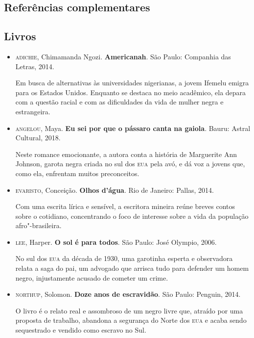\documentclass[11pt]{extarticle}
\begin{document}
\begin{enumerate}
\begin{enumerate}
\begin{enumerate}
\section{Referências complementares}

\subsection{Livros}

\begin{itemize}
\item\textsc{adichie}, Chimamanda Ngozi. \textbf{Americanah}. São Paulo: Companhia
  das Letras, 2014.

Em busca de alternativas às universidades nigerianas, a jovem Ifemelu
emigra para os Estados Unidos. Enquanto se destaca no meio acadêmico,
ela depara com a questão racial e com as dificuldades da vida de mulher
negra e estrangeira.

\item\textsc{angelou}, Maya. \textbf{Eu sei por que o pássaro canta na gaiola}.
  Bauru: Astral Cultural, 2018.

Neste romance emocionante, a autora conta a história de Marguerite Ann
Johnson, garota negra criada no sul dos \textsc{eua} pela avó, e dá voz a jovens
que, como ela, enfrentam muitos preconceitos.

\item\textsc{evaristo}, Conceição. \textbf{Olhos d'água}. Rio de Janeiro: Pallas, 2014.

Com uma escrita lírica e sensível, a escritora mineira reúne breves
contos sobre o cotidiano, concentrando o foco de interesse sobre a vida
da população afro"-brasileira.

\item\textsc{lee}, Harper. \textbf{O sol é para todos}. São Paulo: José Olympio,
  2006.

No sul dos \textsc{eua} da década de 1930, uma garotinha esperta e observadora
relata a saga do pai, um advogado que arrisca tudo para defender um
homem negro, injustamente acusado de cometer um crime.

\item\textsc{northup}, Solomon. \textbf{Doze anos de escravidão}. São Paulo:
  Penguin, 2014.

O livro é o relato real e assombroso de um negro livre que, atraído por
uma proposta de trabalho, abandona a segurança do Norte dos \textsc{eua} e acaba
sendo sequestrado e vendido como escravo no Sul.


\end{itemize}
\end{enumerate}
\end{enumerate}
\end{enumerate}
\end{document}
